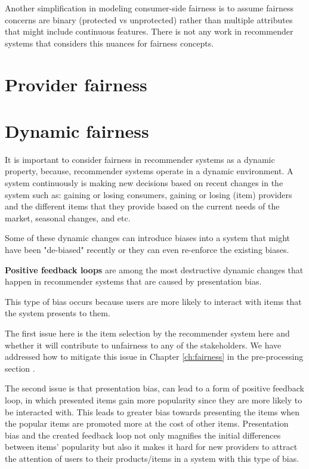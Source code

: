     Another simplification in modeling consumer-side fairness is to assume fairness concerns are binary (protected vs unprotected) rather than multiple attributes that might include continuous features. There is not any work in recommender systems that considers this nuances for fairness concepts.


\section{Provider fairness}

\section{Dynamic fairness}

    It is important to consider fairness in recommender systems as a dynamic property, because, recommender systems operate in a dynamic environment. A system continuously is making new decisions based on recent changes in the system such as: gaining or losing consumers, gaining or losing (item) providers and the different items that they provide based on the current needs of the market, seasonal changes, and etc.

    Some of these dynamic changes can introduce biases into a system that might have been "de-biased" recently or they can even re-enforce the existing biases. 
    
    \textbf{Positive feedback loops} are among the most destructive dynamic changes that happen in recommender systems \cite{o2016weapons} that are caused by presentation bias.
    
    This type of bias occurs because users are more likely to interact with items that the system presents to them. 
    
    The first issue here is the item selection by the recommender system here and whether it will contribute to unfairness to any of the stakeholders. We have addressed how to mitigate this issue in Chapter \ref{ch:fairness} in the pre-processing section . 
    
    The second issue is that presentation bias, can lead to a form of positive feedback loop, in which presented items gain more popularity since they are more likely to be interacted with. This leads to greater bias towards presenting the items when the popular items are promoted more at the cost of other items. Presentation bias and the created feedback loop not only magnifies the initial differences between items' popularity but also it makes it hard for new providers to attract the attention of users to their products/items in a system with this type of bias.
    
